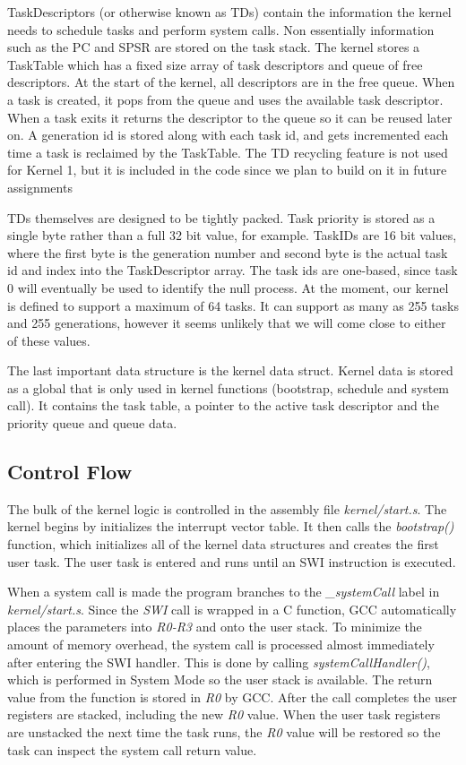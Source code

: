 \documentclass[twoside,a4paper]{refart}
\begin{document}
TaskDescriptors (or otherwise known as TDs) contain the information the kernel needs to schedule tasks and perform system calls. Non essentially information such as the PC and SPSR are stored on the task stack. The kernel stores a TaskTable which has a fixed size array of task descriptors and queue of free descriptors. At the start of the kernel, all descriptors are in the free queue. When a task is created, it pops from the queue and uses the available task descriptor. When a task exits it returns the descriptor to the queue so it can be reused later on. A generation id is stored along with each task id, and gets incremented each time a task is reclaimed by the TaskTable. The TD recycling feature is not used for Kernel 1, but it is included in the code since we plan to build on it in future assignments

TDs themselves are designed to be tightly packed. Task priority is stored as a single byte rather than a full 32 bit value, for example. TaskIDs are 16 bit values, where the first byte is the generation number and second byte is the actual task id and index into the TaskDescriptor array. The task ids are one-based, since task 0 will eventually be used to identify the null process. At the moment, our kernel is defined to support a maximum of 64 tasks. It can support as many as 255 tasks and 255 generations, however it seems unlikely that we will come close to either of these values.

The last important data structure is the kernel data struct. Kernel data is stored as a global that is only used in  kernel functions (bootstrap, schedule and system call). It contains the task table, a pointer to the active task descriptor and the priority queue and queue data.

\subsection{Control Flow}
The bulk of the kernel logic is controlled in the assembly file \textit{kernel/start.s}. The kernel begins by initializes the interrupt vector table. It then calls the \textit{bootstrap()} function, which initializes all of the kernel data structures and creates the first user task. The user task is entered and runs until an SWI instruction is executed.

When a system call is made the program branches to the \textit{\_systemCall} label in \textit{kernel/start.s}. Since the \textit{SWI} call is wrapped in a C function, GCC automatically places the parameters into \textit{R0-R3} and onto the user stack. To minimize the amount of memory overhead, the system call is processed almost immediately after entering the SWI handler. This is done by calling \textit{systemCallHandler()}, which is performed in System Mode so the user stack is available. The return value from the function is stored in \textit{R0} by GCC. After the call completes the user registers are stacked, including the new \textit{R0} value. When the user task registers are unstacked the next time the task runs, the \textit{R0} value will be restored so the task can inspect the system call return value.
\end{document}
